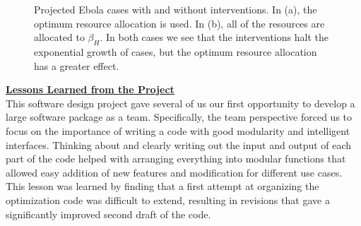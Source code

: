 \documentclass[11pt,letter]{article}
\begin{document}
\begin{figure}
	\centering
\caption{Projected Ebola cases with and without interventions. In (a), the optimum resource allocation is used. In (b), all of the resources are allocated to $\beta_H$. In both cases we see that the interventions halt the exponential growth of cases, but the optimum resource allocation has a greater effect.}
\label{allocation}
\end{figure}

\underline{\textbf{Lessons Learned from the Project}}\vspace{0.5mm}\\
This software design project gave several of us our first opportunity to develop a large software package as a team. Specifically, the team perspective forced us to focus on the importance of writing a code with good modularity and intelligent interfaces. Thinking about and clearly writing out the input and output of each part of the code helped with arranging everything into modular functions that allowed easy addition of new features and modification for different use cases. This lesson was learned by finding that a first attempt at organizing the optimization code was difficult to extend, resulting in revisions that gave a significantly improved second draft of the code. \\
\end{document}
